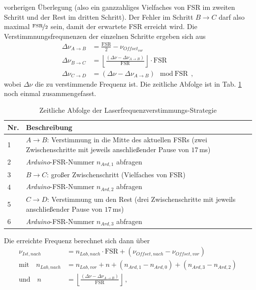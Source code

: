 vorherigen Überlegung (also ein ganzzahliges Vielfaches von FSR im zweiten
Schritt und der Rest im dritten Schritt). Der Fehler im Schritt $B\rightarrow C$
darf also maximal $\nicefrac{\text{FSR}}{2}$ sein, damit der erwartete FSR erreicht wird. Die Verstimmnungsfrequnenzen der einzelnen Schritte ergeben sich aus
\begin{equation}\label{eq:scan-strategie_schritte}
	\begin{split}
		\Delta\nu_{A\rightarrow B}&=\frac{\text{FSR}}{2}-\nu_{Offset_{vor}}\\
		\Delta\nu_{B\rightarrow
		C}&=\left\lfloor\frac{(\Delta\nu-\Delta\nu_{A\rightarrow
		B})}{\text{FSR}}\right\rfloor\cdot\text{FSR}\\
		\Delta\nu_{C\rightarrow D}&=(\Delta\nu-\Delta\nu_{A\rightarrow
		B})\mod\text{FSR}\,,
	\end{split}
\end{equation}
wobei $\Delta\nu$ die zu verstimmende Frequenz ist.
Die zeitliche Abfolge ist in Tab. \ref{tab:scan-strategie_abfolge} noch einmal
zusammengefasst.
\begin{table}
	\begin{tabular}{p{}p{}}
		\toprule
			Nr. & Beschreibung \\
		\midrule[1px]
		\hline
			1 & $A\rightarrow B$: Verstimmung in die Mitte des aktuellen FSRs (zwei
			Zwischenschritte mit jeweils anschließender Pause von $17\,$ms)\\
			2 & \textit{Arduino}-FSR-Nummer $n_{Ard,1}$ abfragen\\
			3 & $B\rightarrow C$: großer Zwischenschritt (Vielfaches von FSR)\\
			4 & \textit{Arduino}-FSR-Nummer $n_{Ard,2}$ abfragen\\
			5 & $C\rightarrow D$: Verstimmung um den Rest (drei Zwischenschritte mit
			jeweils anschließender Pause von $17\,$ms)\\
			6 & \textit{Arduino}-FSR-Nummer $n_{Ard,3}$ abfragen\\
		\bottomrule[1px]
	\end{tabular}
	\caption[Laserfrequenzverstimmungs-Strategie]{Zeitliche Abfolge der
	Laserfrequenzverstimmungs-Strategie}
	\label{tab:scan-strategie_abfolge}
\end{table}
Die erreichte Frequenz berechnet sich dann über
\begin{equation}\label{eq:neue_frequenz_strategie_2}
	\begin{split}
		\nu_{Ist,nach} &=
		n_{Lab,nach}\cdot\text{FSR}+(\nu_{Offset,nach}-\nu_{Offset,vor})\\
		\text{mit}\quad
		n_{Lab,nach} &= n_{Lab,vor}+n+(n_{Ard,1}-n_{Ard,0})+(n_{Ard,3}-n_{Ard,2})\\
		\text{und}\quad
		n &= \left\lfloor\frac{(\Delta\nu-\Delta\nu_{A\rightarrow
		B})}{\text{FSR}}\right\rfloor\,,
	\end{split}
\end{equation}
